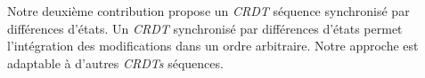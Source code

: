 \begin{ThesisAbstract}
\begin{FrenchAbstract}
Notre deuxième contribution propose un \emph{CRDT} séquence synchronisé par différences d'états.
Un \emph{CRDT} synchronisé par différences d'états permet l'intégration des modifications dans un ordre arbitraire.
Notre approche est adaptable à d'autres \emph{CRDTs} séquences.








\end{FrenchAbstract}
\end{ThesisAbstract}
